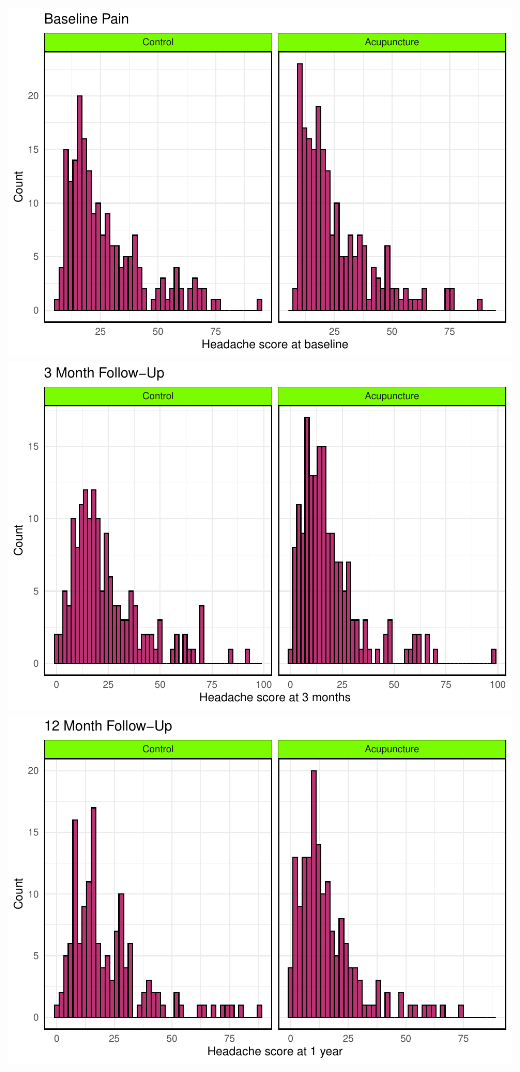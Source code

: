 \documentclass{article}
\newcommand{\pandocbounded}[1]{#1}
\begin{document}
\pandocbounded{\includegraphics[keepaspectratio]{Final_Report_files/figure-latex/unnamed-chunk-4-1.pdf}}
\pandocbounded{\includegraphics[keepaspectratio]{Final_Report_files/figure-latex/unnamed-chunk-4-2.pdf}}
\pandocbounded{\includegraphics[keepaspectratio]{Final_Report_files/figure-latex/unnamed-chunk-4-3.pdf}}
\end{document}
